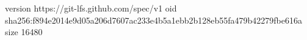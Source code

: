 version https://git-lfs.github.com/spec/v1
oid sha256:f894e2014e9d05a206d7607ac233e4b5a1ebb2b128eb55fa479b42279fbe616a
size 16480
